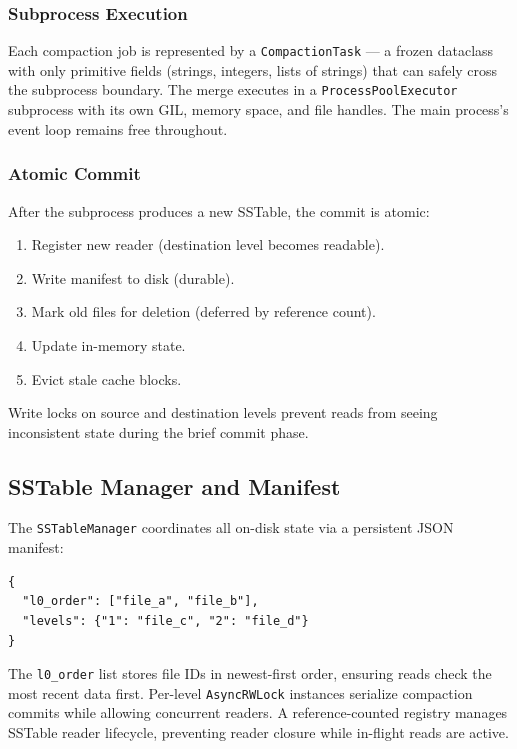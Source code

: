 \documentclass[conference]{IEEEtran}
\begin{document}
\subsubsection{Subprocess Execution}

Each compaction job is represented by a \texttt{CompactionTask} --- a frozen dataclass with only primitive fields (strings, integers, lists of strings) that can safely cross the subprocess boundary. The merge executes in a \texttt{ProcessPoolExecutor} subprocess with its own GIL, memory space, and file handles. The main process's event loop remains free throughout.

\subsubsection{Atomic Commit}

After the subprocess produces a new SSTable, the commit is atomic:
\begin{enumerate}[leftmargin=*]
    \item Register new reader (destination level becomes readable).
    \item Write manifest to disk (durable).
    \item Mark old files for deletion (deferred by reference count).
    \item Update in-memory state.
    \item Evict stale cache blocks.
\end{enumerate}

Write locks on source and destination levels prevent reads from seeing inconsistent state during the brief commit phase.

\subsection{SSTable Manager and Manifest}

The \texttt{SSTableManager} coordinates all on-disk state via a persistent JSON manifest:

\begin{lstlisting}[caption={Manifest structure},label={lst:manifest}]
{
  "l0_order": ["file_a", "file_b"],
  "levels": {"1": "file_c", "2": "file_d"}
}
\end{lstlisting}

The \texttt{l0\_order} list stores file IDs in newest-first order, ensuring reads check the most recent data first. Per-level \texttt{AsyncRWLock} instances serialize compaction commits while allowing concurrent readers. A reference-counted registry manages SSTable reader lifecycle, preventing reader closure while in-flight reads are active.
\end{document}
